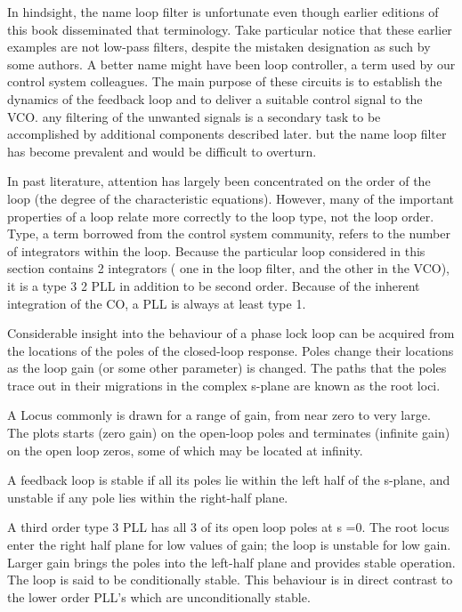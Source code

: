 In hindsight, the name loop filter is unfortunate even though earlier editions of this book disseminated that terminology. Take particular notice that these earlier examples are not low-pass filters, despite the mistaken designation as such by some authors. A better name might have been loop controller, a term used by our control system colleagues. The main purpose of these circuits is to establish the dynamics of the feedback loop and to deliver a suitable control signal to the VCO. any filtering of the unwanted signals is a secondary task to be accomplished by additional components described later. but the name loop filter has become prevalent and would be difficult to overturn.

In past literature, attention has largely been concentrated on the order of the loop (the degree of the characteristic equations). However, many of the important properties of a loop relate more correctly to the loop type, not the loop order. Type, a term borrowed from the control system community, refers to the number of integrators within the loop. Because the particular loop considered in this section contains 2 integrators ( one in the loop filter, and the other in the VCO), it is a type 3 2 PLL in addition to be second order. Because of the inherent integration of the CO, a PLL is always at least type 1. 


Considerable insight into the behaviour of a phase lock loop can be acquired from the locations of the poles of the closed-loop response. Poles change their locations as the loop gain (or some other parameter) is changed. The paths that the poles trace out in their migrations in the complex s-plane are known as the root loci. 


A Locus commonly is drawn for a range of gain, from near zero to very large. The plots starts (zero gain) on the open-loop poles and terminates (infinite gain) on the open loop zeros, some of which may be located at infinity. 

A feedback loop is stable if all its poles lie within the left half of the s-plane, and unstable if any pole lies within the right-half plane. 


A third order type 3 PLL has all 3 of its open loop poles at s =0. The root locus enter the right half plane for low values of gain; the loop is unstable for low gain. Larger gain brings the poles into the left-half plane and provides stable operation. The loop is said to be conditionally stable. This behaviour is in direct contrast to the lower order PLL's which are unconditionally stable. 

